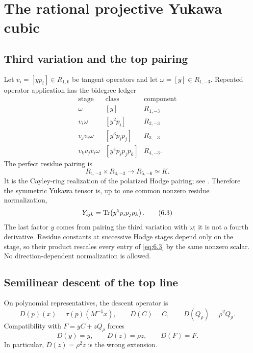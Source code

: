 \section{The rational projective Yukawa cubic}
\label{sec:rational-cubic}

\subsection{Third variation and the top pairing}

Let \(v_i=[yp_i]\in R_{1,0}\) be tangent operators and let
\(\omega=[y]\in R_{1,-3}\).  Repeated operator application has the
bidegree ledger
\[
\begin{array}{c|c|c}
\text{stage}&\text{class}&\text{component}\\ \hline
\omega&[y]&R_{1,-3}\\
v_i\omega&[y^2p_i]&R_{2,-3}\\
v_jv_i\omega&[y^3p_ip_j]&R_{3,-3}\\
v_kv_jv_i\omega&[y^4p_ip_jp_k]&R_{4,-3}.
\end{array}                                         \tag{6.1}
\]
The perfect residue pairing is
\[
 R_{1,-3}\times R_{4,-3}\longrightarrow R_{5,-6}\simeq K.
                                                               \tag{6.2}
\]
It is the Cayley-ring realization of the polarized Hodge pairing; see
\cite[Theorem 6.1(4) and Lemma 6.2]{Konno1991}.  Therefore the symmetric
Yukawa tensor is, up to one common nonzero residue normalization,
\[
 Y_{ijk}=\operatorname{Tr}\!\left(y^5p_ip_jp_k\right).            \tag{6.3}
\label{eq:6.3}
\]
The last factor \(y\) comes from pairing the third variation with
\(\omega\); it is not a fourth derivative.  Residue constants at successive
Hodge stages depend only on the stage, so their product rescales every
entry of \cref{eq:6.3} by the same nonzero scalar.  No
direction-dependent normalization is allowed.

\subsection{Semilinear descent of the top line}

On polynomial representatives, the descent operator is
\[
 D(p)(x)=\tau(p)(M^{-1}x),\qquad
 D(C)=C,\qquad D(Q_\rho)=\rho^2Q_\rho.              \tag{6.4}
\]
Compatibility with \(F=yC+zQ_\rho\) forces
\[
 D(y)=y,\qquad D(z)=\rho z,\qquad D(F)=F.           \tag{6.5}
\]
In particular, \(D(z)=\rho^2z\) is the wrong extension.

